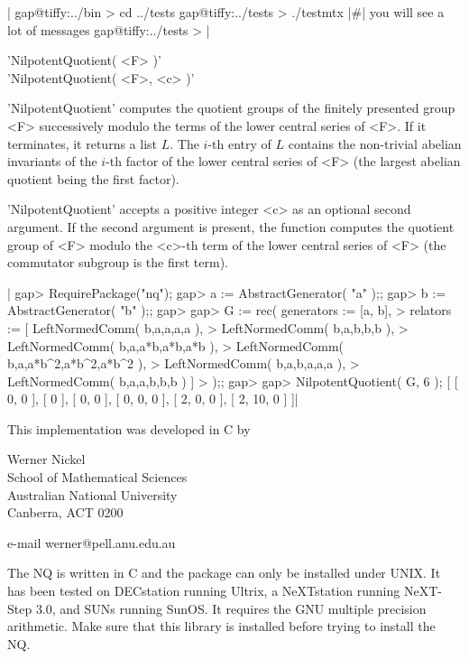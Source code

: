 |    gap@tiffy:../bin > cd ../tests
    gap@tiffy:../tests > ./testmtx
    |\#| you will see a lot of messages
    gap@tiffy:../tests > |


'NilpotentQuotient( <F> )' \\
'NilpotentQuotient( <F>, <c> )'

'NilpotentQuotient'   computes the  quotient    groups of the finitely
presented group <F> successively modulo the terms of the lower central
series  of  <F>. If it  terminates, it returns a list  $L$. The $i$-th
entry of $L$ contains the non-trivial abelian invariants of the $i$-th
factor   of the lower   central series  of   <F> (the  largest abelian
quotient being the first factor).

'NilpotentQuotient'  accepts  a positive  integer <c>   as an optional
second argument.    If the second  argument is  present,  the function
computes the quotient group of <F> modulo the <c>-th term of the lower
central series of <F> (the commutator subgroup is the first term).

|    gap> RequirePackage("nq");
    gap> a := AbstractGenerator( "a" );;
    gap> b := AbstractGenerator( "b" );;
    gap>
    gap> G := rec( generators := [a, b],
    >     relators   := [ LeftNormedComm( b,a,a,a,a ),
    >                     LeftNormedComm( b,a,b,b,b ),
    >                     LeftNormedComm( b,a,a*b,a*b,a*b ),
    >                     LeftNormedComm( b,a,a*b^2,a*b^2,a*b^2 ),
    >                     LeftNormedComm( b,a,b,a,a,a ),
    >                     LeftNormedComm( b,a,a,b,b,b ) ]
    >    );;
    gap>
    gap> NilpotentQuotient( G, 6 );
    [ [ 0, 0 ], [ 0 ], [ 0, 0 ], [ 0, 0, 0 ], [ 2, 0, 0 ], [ 2, 10, 0 ] ]|

This implementation was developed in C by

Werner Nickel\\
School of Mathematical Sciences\\
Australian National University\\
Canberra, ACT 0200

e-mail werner@pell.anu.edu.au


The NQ is written in C and the package can only be installed  under UNIX.
It  has been tested  on DECstation  running Ultrix, a NeXTstation running
NeXT-Step  3.0, and  SUNs  running SunOS.  It  requires  the GNU multiple
precision  arithmetic.  Make  sure that  this library is installed before
trying to install the NQ.

